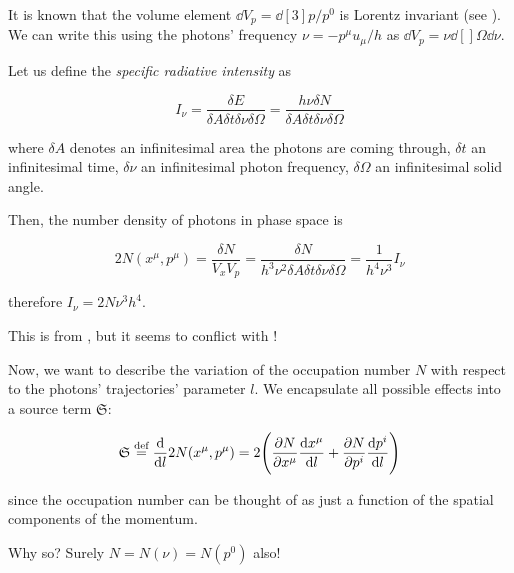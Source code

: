 \documentclass[main.tex]{subfiles}
\begin{document}
It is known that the volume element \(\dd{V}_p = \dd[3]{p} / p^0 \) is Lorentz invariant (see \cite[box 22.5]{MisnerThorneWheeler:1973}).
We can write this using the photons' frequency \(\nu = - p^\mu u_\mu / h\) as \(\dd{V}_p = \nu \dd[]{\Omega} \dd{\nu} \).

Let us define the \emph{specific radiative intensity} as

\begin{equation}
  I_\nu = \frac{\delta E}{\delta A \delta  t \delta \nu \delta \Omega}
  = \frac{h \nu \delta N}{\delta A \delta  t \delta \nu \delta \Omega}
\end{equation}

where \(\delta A\) denotes an infinitesimal area the photons are coming through, \(\delta t\) an infinitesimal time, \(\delta \nu\) an infinitesimal photon frequency, \(\delta \Omega\) an infinitesimal solid angle.

Then, \cite[figure 22.2]{MisnerThorneWheeler:1973} the number density of photons in phase space is

\begin{equation}
  2N(x^\mu, p^\mu) = \frac{\delta N}{V_x V_p} =  \frac{\delta N}{h^3 \nu^2\delta A \delta  t \delta \nu \delta \Omega} = \frac{1}{h^4 \nu^3} I_\nu
\end{equation}

therefore \(I_\nu = 2 N \nu^3 h^4\).

\begin{greenbox}
  This is from \cite[figure 22.2]{MisnerThorneWheeler:1973}, but it seems to conflict with \cite[equation 6.2]{Thorne:1981feb}!
\end{greenbox}

Now, we want to describe the variation of the occupation number \(N\) with respect to the photons' trajectories' parameter \(l\). We encapsulate all possible effects into a source term \(\mathfrak S\):

\begin{equation}
    \mathfrak S \stackrel{\text{def}}{=} \dv{}{l} 2N(x^\mu, p^\mu) =
    2 \qty(\pdv{N}{x^\mu} \dv{x^\mu}{l} + \pdv{N}{p^i} \dv{p^i}{l}  )
\end{equation}

since the occupation number can be thought of as just a function of the spatial components of the momentum.

\begin{greenbox}
  Why so? Surely \(N = N(\nu) = N(p^0)\) also!
\end{greenbox}
\end{document}
